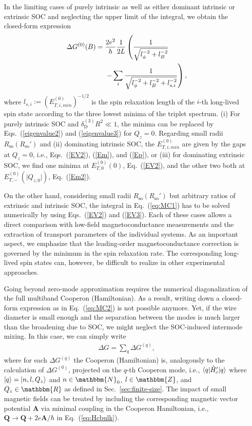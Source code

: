 \documentclass[superscriptaddress,noshowpacs,noshowkeys, twocolumn, floatfix,aps, prb,reprint]{revtex4-1}
\begin{document}
In the limiting cases of purely intrinsic as well as either dominant intrinsic or extrinsic SOC and neglecting the upper limit of the integral, we obtain the closed-form expression
%
\begin{align}
\Delta G^{(0)}(B)={}&\frac{2e^2}{h}\frac{1}{2 L}\left(\frac{1}{\sqrt{l_\phi^{-2}+l_B^{-2}}}\right.\notag\\
&\left.-\sum_{i}\frac{1}{\sqrt{l_\phi^{-2}+l_B^{-2}+l_{s,i}^{-2}}} \right),
\label{eq:MC2}
\end{align}
%
where  $l_{s,i}:=\left(E_{T,i,min}^{(0)}\right)^{-1/2}$ is the spin relaxation length of the $i$-th long-lived spin state according to the three lowest minima of the triplet spectrum.
(i) For purely intrinsic SOC and $\delta_\text{D}^{(3)}R^2 \ll 1$, the minima can be replaced by Eqs.~(\ref{eigenvalue2}) and (\ref{eigenvalue3}) for $Q_z=0$.
Regarding small radii $R_\text{so}(R_\text{so}')$ and
(ii) dominating intrinsic SOC, the $E_{T,i,min}^{(0)}$ are given by the gaps at $Q_z=0$, i.e., Eqs.~(\ref{EV2}), (\ref{Em}), and (\ref{Ep}), or
(iii) for dominating extrinsic SOC, we find one minima at $E_{T,0}^{(0)}(0)$, Eq.~(\ref{EV2}), and the other two both at $E^{(0)}_{T,-}(\vert Q_{z,0}\vert)$, Eq.~(\ref{Em2}).

On the other hand, considering small radii $R_\text{so}(R_\text{so}')$ but arbitrary ratios of extrinsic and intrinsic SOC, the integral in Eq.~(\ref{eq:MC1})  has to be solved numerically by using Eqs.~(\ref{EV2}) and  (\ref{EV3}).
Each of these cases allows a direct comparison with low-field magnetoconductance measurements and the extraction of transport parameters of the individual systems.
As an important aspect, we emphasize that the leading-order magnetoconductance correction is governed by the minimum in the spin relaxation rate. 
The corresponding long-lived spin states can, however, be difficult to realize in other experimental approaches.


Going beyond zero-mode approximation  requires the numerical diagonalization of the full multiband Cooperon (Hamiltonian).
As a result, writing down a closed-form expression as in Eq.~(\ref{eq:MC2}) is not possible anymore.
Yet, if the wire diameter is small enough 
and the separation between the modes is much larger than the broadening due to SOC, we might neglect the SOC-induced intermode mixing.
In this case, we can simply write 
%
\begin{align}
\Delta G=\sum_q \Delta G^{(q)},
\end{align}
%
where for each $\Delta G^{(q)}$ the Cooperon (Hamiltonian) is, analogously to the calculation of $\Delta G^{(0)}$, projected on the $q$-th Cooperon mode, i.e., $\braket{q|\hat{H}_c'|q}$ where $\ket{q}=\ket{n,l,Q_z}$ 
and $n\in\mathbbm{N}_0$, $l\in\mathbbm{Z}$, and $Q_z\in\mathbbm{R}$ 
as defined in Sec.~\ref{sec:finite-size}.
The impact of small magnetic fields can be treated by including the corresponding magnetic vector potential $\mathbf{A}$ via minimal coupling in the Cooperon Hamiltonian, i.e., $\mathbf{Q}\rightarrow \mathbf{Q}+2e\mathbf{A}/\hbar$ in Eq.~(\ref{eq:Hcbulk}).
\end{document}
